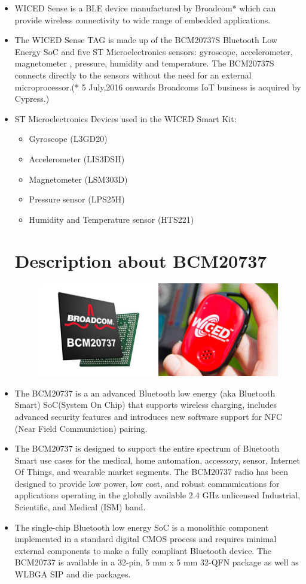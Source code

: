 \documentclass[11pt,a4paper]{article}
\begin{document}
\begin{itemize}
\item WICED Sense is a BLE device manufactured by Broadcom* which can provide wireless connectivity to wide range of embedded applications.
\item The WICED Sense TAG is made up of the BCM20737S Bluetooth Low Energy SoC and five ST Microelectronics sensors: gyroscope, accelerometer, magnetometer , pressure, humidity and temperature. The BCM20737S connects directly to the sensors without the need for an external microprocessor.(* 5 July,2016 onwards Broadcoms IoT business is acquired by Cypress.)
\item ST Microelectronics Devices used in the WICED Smart Kit:
\begin{itemize}
\item Gyroscope (L3GD20)
\item Accelerometer (LIS3DSH)
\item Magnetometer (LSM303D)
\item Pressure sensor (LPS25H)
\item Humidity and Temperature sensor (HTS221)
\end{itemize}


\newpage
\section{Description about BCM20737}

\begin{figure}[h]
    \centering
	\includegraphics[scale=0.5]{BCM20737.jpg}
		\caption{}
	\end{figure}



\item The BCM20737 is a an advanced Bluetooth low energy (aka Bluetooth Smart) 
SoC(System On Chip) that supports wireless charging, includes advanced security features and introduces new software support for NFC (Near Field Communiction) pairing. 
\item The BCM20737 is designed to support the entire spectrum of Bluetooth Smart use cases for the medical, home automation, accessory, sensor, Internet Of Things, and wearable market
segments. The BCM20737 radio has been designed to provide
low power, low cost, and robust communications for applications operating in the globally available
2.4 GHz unlicensed Industrial, Scientific, and Medical
(ISM) band.
\item The single-chip Bluetooth low energy SoC is a
monolithic component implemented in a standard
digital CMOS process and requires minimal external
components to make a fully compliant Bluetooth
device. The BCM20737 is available in a 32-pin,
5 mm x 5 mm 32-QFN package as well as WLBGA
SIP and die packages.


\end{itemize}
\end{document}
